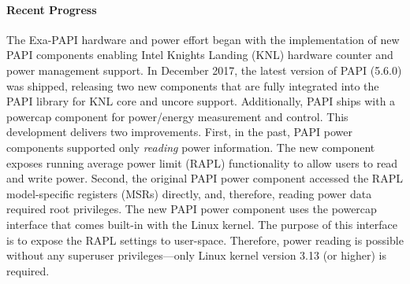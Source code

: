 \paragraph{Recent Progress}

The Exa-PAPI hardware and power effort began with the implementation of new
PAPI components enabling Intel Knights Landing (KNL) hardware counter and power
management support. In December 2017, the latest version of PAPI (5.6.0) was
shipped, releasing two new components that are fully integrated into the PAPI library for 
KNL core and uncore support. Additionally, PAPI ships with a powercap component for 
power/energy measurement and control. This development delivers two improvements. 
First, in the past, PAPI power components supported only \emph{reading} power information. 
The new component exposes running average power limit (RAPL) functionality to allow users 
to read and write power. Second, the original PAPI power component accessed the RAPL 
model-specific registers (MSRs) directly, and, therefore, reading
power data required root privileges. The new PAPI power component uses the
powercap interface that comes built-in with the Linux kernel. The purpose of this
interface is to expose the RAPL settings to user-space. Therefore, power
reading is possible without any superuser privileges---only Linux kernel version
3.13 (or higher) is required.

